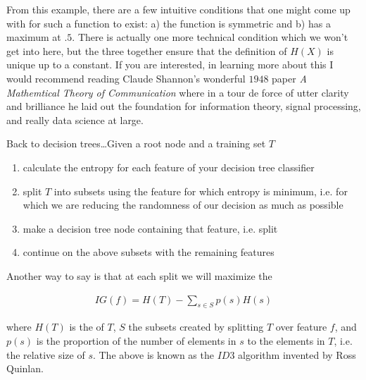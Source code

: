 From this example, there are a few intuitive conditions that one might come up with for such a function to exist: a) the function is symmetric and b) has a maximum at $.5$. There is actually one more technical condition which we won't get into here, but the three together ensure that the definition of $H(X)$ is unique up to a constant. If you are interested, in learning more about this I would recommend reading Claude Shannon's wonderful $1948$ paper \textit{A Mathemtical Theory of Communication} where in a tour de force of utter clarity and brilliance he laid out the foundation for information theory, signal processing, and really data science at large.


Back to decision trees\ldots Given a root node and a training set $T$

\begin{enumerate}
    \item calculate the entropy for each feature of your decision tree classifier 
    \item split $T$ into subsets using the feature for which entropy is minimum, i.e. for which we are reducing the randomness of our decision as much as possible
    \item make a decision tree node containing that feature, i.e. split
    \item continue on the above subsets with the remaining features
\end{enumerate}


Another way to say is that at each split we will maximize the  

\begin{align*}
    IG(f) = H(T) - \sum_{s \in S} p(s)H(s)
\end{align*}

where $H(T)$ is the  of $T$, $S$ the subsets created by splitting $T$ over feature $f$, and $p(s)$ is the proportion of the number of elements in $s$ to the elements in $T$, i.e. the relative size of $s$. The above is known as the $ID3$ algorithm invented by Ross Quinlan. 



